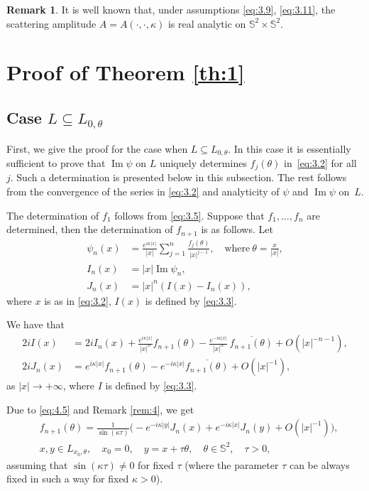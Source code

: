 \documentclass[JEP,XML,SOM,Unicode,NoEqCountersInSection,published]{cedram}
\renewcommand{\Im}{\mathop{\mathrm{Im}}}
\theoremstyle{definition}
\newtheorem{remark}{Remark}
\begin{document}
\begin{remark}\label{rem:5}
It is well known that, under assumptions \eqref{eq:3.9}, \eqref{eq:3.11}, the scattering amplitude $A=A(\cdot, \cdot, \kappa)$ is real analytic on $\mathbb S^2 \times \mathbb S^2$.
\end{remark}

\section{Proof of Theorem \ref{th:1}}\label{sec:4}

\subsection{Case $L\subseteq L_{0, \theta}$}\label{subsec:4.1}
First, we give the proof for the case when $L\subseteq L_{0, \theta}$.
In this case it is essentially sufficient to prove that $\Im\psi$ on $L$ uniquely determines $f_j(\theta)$ in~\eqref{eq:3.2} for all $j$.
Such a determination is presented below in this subsection.
The rest follows from the convergence of the series in \eqref{eq:3.2} and analyticity of $\psi$ and $\Im\psi$ on~$L$.

The determination of $f_1$ follows from \eqref{eq:3.5}.
Suppose that $f_1,\dots,f_n$ are determined, then the determination of $f_{n+1}$ is as follows.
Let
\begin{align}
\label{eq:4.1}
\psi_n(x)&=\frac{e^{i\kappa|x|}}{|x|}\sum\limits_{j=1}^{n}\frac{f_j(\theta)}{|x|^{j-1}}, \quad \text{where}\ \theta=\frac{x}{|x|},
\\
\label{eq:4.2}
I_n(x)&=|x|\Im\psi_n,
\\
\label{eq:4.3}
J_n(x)&=|x|^n(I(x)-I_n(x)),
\end{align}
where $x$ is as in \eqref{eq:3.2}, $I(x)$ is defined by \eqref{eq:3.3}.

We have that
\begin{align}
\label{eq:4.4}
2iI(x)&=2iI_n(x)+ \frac{e^{i\kappa|x|}}{|x|^n}{f_{n+1}(\theta)}- \frac{e^{-i\kappa|x|}}{|x|^n}\,\overline{f_{n+1}(\theta)}+O(|x|^{-n-1}),
\\
\label{eq:4.5}
2iJ_n(x)&=e^{i\kappa|x|}{f_{n+1}(\theta)} - e^{-i\kappa|x|}\overline{f_{n+1}(\theta)}+O(|x|^{-1}),
\end{align}
as $|x|\to +\infty$, where $I$ is defined by \eqref{eq:3.3}.

Due to \eqref{eq:4.5} and Remark \ref{rem:4}, we get
\begin{equation}\label{eq:4.6}
\begin{aligned}
&f_{n+1}(\theta)= \frac{1}{\sin(\kappa\tau)}\bigl(-e^{-i\kappa|y|}J_n(x)+e^{-i\kappa|x|}J_n(y)+O(|x|^{-1})\bigr),\\
&x,y\in L_{x_0, \theta},\quad x_0=0,\quad y=x+\tau\theta, \quad \theta\in\mathbb S^2,\quad \tau>0,
\end{aligned}
\end{equation}
assuming that $\sin(\kappa\tau)\ne 0$ for fixed $\tau$
(where the parameter $\tau$ can be always fixed in such a way for fixed $\kappa>0$).
\end{document}
